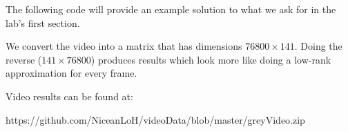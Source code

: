 The following code will provide an example solution to what we ask for in the lab's first section.


We convert the video into a matrix that has dimensions $76800 \times 141$. Doing the reverse ($141 \times 76800$) produces results which look more like doing a low-rank approximation for every frame.

Video results can be found at:

https://github.com/NiceanLoH/videoData/blob/master/greyVideo.zip
